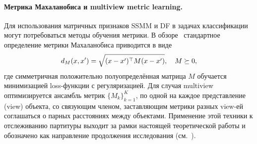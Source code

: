 \paragraph*{Метрика Махаланобиса и multiview metric learning.}
Для использования матричных признаков SSMM и DF в задачах
классификации могут потребоваться методы обучения метрики.
В обзоре~\cite{Bellet2014Metric} стандартное определение
метрики Махаланобиса приводится в виде
\begin{equation}
d_M(x, x') = \sqrt{(x - x')^\top M (x - x')}, \quad M\succeq 0,
\eqlab{mahalanobis}
\end{equation}
где симметричная положительно полуопределённая матрица $M$
обучается минимизацией loss-функции с регуляризацией. Для
случая multiview~\cite{Johnston2020} оптимизируется
ансамбль метрик $\{M_k\}_{k=1}^{K}$, по одной на каждое
представление (view) объекта, со связующим членом, заставляющим
метрики разных view-ей соглашаться о парных расстояниях между
объектами. Применение этой техники к отслеживанию партитуры
выходит за рамки настоящей теоретической работы и обозначено
как направление продолжения исследования
(см.~).
